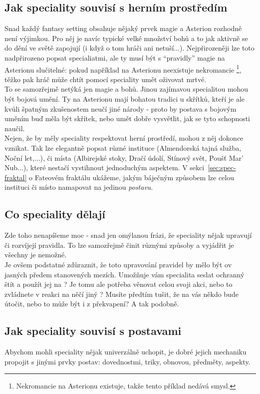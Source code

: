 \subsection{Jak speciality souvisí s herním prostředím}
\label{sec:spec-prvky}

Snad každý fantasy setting obsahuje nějaký prvek magie a Asterion rozhodně není výjimkou. Pro něj je navíc typické velké množství bohů a to jak aktivně se do dění ve světě zapojují (i když o tom hráči ani netuší...). Nejpřirozeněji lze toto nadpřirozeno popsat specialiatmi, ale ty musí být s ``pravidly'' magie na Asterionu slučitelné: pokud například na Asterionu neexistuje nekromancie \footnote{Nekromancie na Asterionu existuje, takže tento příklad nedává smysl.}, těžko pak hráč může chtít pomocí speciality umět oživovat mrtvé.\\
To se samozřejmě netýká jen magie a bohů. Jinou zajímavou specialitou mohou být bojová umění. Ty na Asterionu mají bohatou tradici u skřítků, kteří je ale kvůli špatným zkušenostem neučí jiné národy - proto by postava s bojovým uměním buď měla být skřítek, nebo umět dobře vysvětlit, jak se tyto schopnosti naučil.\\
Nejen, že by měly speciality respektovat herní prostředí, mohou z něj dokonce vznikat. Tak lze elegantně popsat různé instituce (Almendorská tajná služba, Noční let,...), či místa (Albirejské stoky, Dračí údolí, Stínový svět, Poušť Mar' Nub...), které nestačí vystihnout jednoduchým aspektem. V sekci~\ref{sec:spec-fraktal} o Fateovém fraktálu ukážeme, jakým báječným způsobem lze celou instituci či místo namapovat na jedinou \textit{postavu}.

\subsection{Co speciality dělají}
\label{sec:spec-delaji}
Zde toho nenapíšeme moc - snad jen omýlanou frázi, že speciality nějak upravují či rozvíjejí pravidla. To lze samozřejmě činit různými způsoby a vyjádřit je všechny je nemožné. \\
Je ovšem podstatné zdůraznit, že toto upravování pravidel by mělo být ov jasných předem stanovených mezích. Umožňuje vám specialita seslat ochranný štít a použít jej na ? Je tomu ale potřeba věnovat celou svoji akci, nebo to zvládnete v reakci na něčí jiný ? Musíte předtím tušit, že na vás někdo bude útočit, nebo to může být i z překvapení? A tak podobně.

\subsection{Jak speciality souvisí s postavami}
\label{sec:spec-postavy}
Abychom mohli speciality nějak univerzálně uchopit, je dobré jejich mechaniku propojit s jinými prvky postav: dovednostmi, triky, obnovou, předměty, aspekty.



